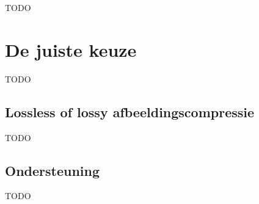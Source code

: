 TODO

\section{De juiste keuze}
\label{sec:afbeeldingscompressie-keuze}

TODO

\subsection{Lossless of lossy afbeeldingscompressie}
\label{sec:afbeeldingscompressie-lossless-of-lossy}

TODO

\subsection{Ondersteuning}
\label{sec:afbeeldingscompressie-ondersteuning}

TODO
